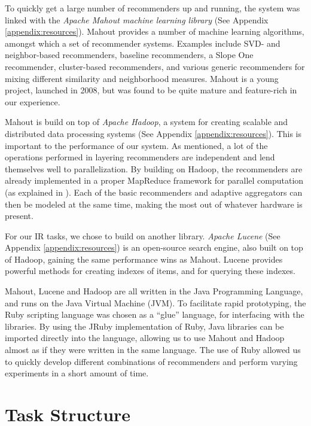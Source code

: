 To quickly get a large number of recommenders up and running,
the system was linked with the \emph{Apache Mahout machine learning library}
(See Appendix \ref{appendix:resources}). 
Mahout provides a number of machine learning
algorithms, amongst which a set of recommender systems.
Examples include SVD- and neighbor-based recommenders,
baseline recommenders, a Slope One recommender,
cluster-based recommenders,
and various generic recommenders for mixing different 
similarity and neighborhood measures.
Mahout is a young project, launched in 2008, 
but was found to be quite mature and feature-rich
in our experience.

Mahout is build on top of \emph{Apache Hadoop},
a system for creating scalable and distributed data processing systems 
(See Appendix \ref{appendix:resources}).
This is important to the performance of our system.
As mentioned, a lot of the operations performed in layering recommenders
are independent and lend themselves well to parallelization.
By building on Hadoop, the recommenders are already implemented in a 
proper MapReduce framework for parallel computation (as explained in \citet[p75]{Manning2008}).
Each of the basic recommenders and adaptive aggregators can then be modeled at the same time,
making the most out of whatever hardware is present.

For our IR tasks, we chose to build on another library.
\emph{Apache Lucene} (See Appendix \ref{appendix:resources}) is an open-source search engine, also built on top of Hadoop,
gaining the same performance wins as Mahout.
Lucene provides powerful methods for creating indexes of items, and for querying these indexes.

Mahout, Lucene and Hadoop are all written in the Java Programming Language,
and runs on the Java Virtual Machine (JVM).
To facilitate rapid prototyping, the Ruby scripting language was chosen as a ``glue'' language,
for interfacing with the libraries. 
By using the JRuby implementation of Ruby, Java libraries can be imported directly
into the language, allowing us to use Mahout and Hadoop almost as if they were written in the same language.
The use of Ruby allowed us to quickly develop different combinations of recommenders and
perform varying experiments in a short amount of time.

\section{Task Structure}

